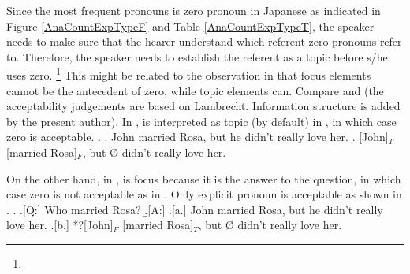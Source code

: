Since the most frequent pronouns is zero pronoun in Japanese as indicated in Figure \ref{AnaCountExpTypeF} and Table \ref{AnaCountExpTypeT},
the speaker needs to make sure that the hearer understand which referent zero pronouns refer to.
Therefore, the speaker needs to establish the referent as a topic
before s/he uses zero.%
 \footnote{}
This might be related to the observation in  that
focus elements cannot be the antecedent of zero,
while topic elements can.
Compare \Next and \NNext (the acceptability judgements are based on Lambrecht. Information structure is added by the present author).
In \Next,  is interpreted as topic (by default) in \Next[b],
in which case zero is acceptable.
%
\ex.\label{WO:TopicAppearClause-Initially:Ex:John}
 \a. John married Rosa, but he didn't really love her.
 \b. [John]$_{T}$ [married Rosa]$_{F}$, but {\O} didn't really love her.

On the other hand,
in \Next,
 is focus because it is the answer to the question,
in which case zero is not acceptable as in \Next[b].
Only explicit pronoun is acceptable as shown in \Next[a].
%
\ex.\label{WO:TopicAppearClause-Initially:Ex:Rosa}
 \a.[Q:] Who married Rosa?
 \b.[A:]
   \a.[a.] John married Rosa, but he didn't really love her.
   \b.[b.] *?[John]$_{F}$ [married Rosa]$_{T}$, but {\O} didn't really love her.


